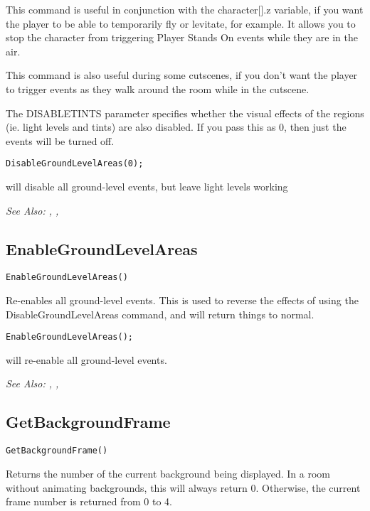 This command is useful in conjunction with the character[].z variable, if you want the player
to be able to temporarily fly or levitate, for example. It allows you to stop the character
from triggering Player Stands On events while they are in the air.

This command is also useful during some cutscenes, if you don't want the player to trigger
events as they walk around the room while in the cutscene.

The DISABLETINTS parameter specifies whether the visual effects of the regions (ie. light
levels and tints) are also disabled. If you pass this as 0, then just the events will
be turned off.

\begin{verbatim}
DisableGroundLevelAreas(0);
\end{verbatim}
will disable all ground-level events, but leave light levels working

\it{See Also:} , ,


\subsection{EnableGroundLevelAreas}\label{EnableGroundLevelAreas}%

\begin{verbatim}
EnableGroundLevelAreas()
\end{verbatim}
Re-enables all ground-level events. This is used to reverse the effects of
using the DisableGroundLevelAreas command, and will return things to normal.

\begin{verbatim}
EnableGroundLevelAreas();
\end{verbatim}
will re-enable all ground-level events.

\it{See Also:} , ,


\subsection{GetBackgroundFrame}\label{GetBackgroundFrame}%

\begin{verbatim}
GetBackgroundFrame()
\end{verbatim}
Returns the number of the current background being displayed. In a room
without animating backgrounds, this will always return 0. Otherwise, the
current frame number is returned from 0 to 4.

